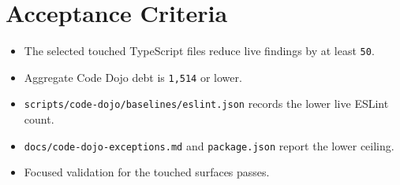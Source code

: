 \section{Acceptance Criteria}\label{record-226-acceptance-criteria}

\begin{itemize}
\tightlist
\item
  The selected touched TypeScript files reduce live findings by at least \texttt{5\allowbreak{}0}.
\item
  Aggregate Code Dojo debt is \texttt{1\allowbreak{},\allowbreak{}5\allowbreak{}1\allowbreak{}4} or lower.
\item
  \texttt{s\allowbreak{}c\allowbreak{}r\allowbreak{}i\allowbreak{}p\allowbreak{}t\allowbreak{}s\allowbreak{}/\allowbreak{}c\allowbreak{}o\allowbreak{}d\allowbreak{}e\allowbreak{}-\allowbreak{}d\allowbreak{}o\allowbreak{}j\allowbreak{}o\allowbreak{}/\allowbreak{}b\allowbreak{}a\allowbreak{}s\allowbreak{}e\allowbreak{}l\allowbreak{}i\allowbreak{}n\allowbreak{}e\allowbreak{}s\allowbreak{}/\allowbreak{}e\allowbreak{}s\allowbreak{}l\allowbreak{}i\allowbreak{}n\allowbreak{}t\allowbreak{}.\allowbreak{}j\allowbreak{}s\allowbreak{}o\allowbreak{}n} records the lower live ESLint count.
\item
  \texttt{d\allowbreak{}o\allowbreak{}c\allowbreak{}s\allowbreak{}/\allowbreak{}c\allowbreak{}o\allowbreak{}d\allowbreak{}e\allowbreak{}-\allowbreak{}d\allowbreak{}o\allowbreak{}j\allowbreak{}o\allowbreak{}-\allowbreak{}e\allowbreak{}x\allowbreak{}c\allowbreak{}e\allowbreak{}p\allowbreak{}t\allowbreak{}i\allowbreak{}o\allowbreak{}n\allowbreak{}s\allowbreak{}.\allowbreak{}m\allowbreak{}d} and \texttt{p\allowbreak{}a\allowbreak{}c\allowbreak{}k\allowbreak{}a\allowbreak{}g\allowbreak{}e\allowbreak{}.\allowbreak{}j\allowbreak{}s\allowbreak{}o\allowbreak{}n} report the lower ceiling.
\item
  Focused validation for the touched surfaces passes.
\end{itemize}

